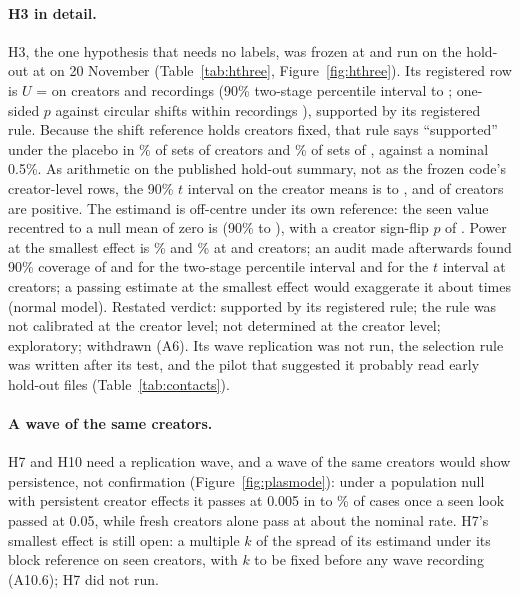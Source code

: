 \paragraph{H3 in detail.} H3, the one hypothesis that needs no labels, was frozen at \HThreeFrozenStamp{} and run on the
hold-out at \HThreeRunStamp{} on 20 November (Table~\ref{tab:hthree}, Figure~\ref{fig:hthree}). Its registered row is
$U$ = \HThreeU{} on \HThreeCreators{} creators and \HThreeRecordings{} recordings (90\% two-stage percentile interval
\HThreeRegLo{} to \HThreeRegHi; one-sided $p$ against circular shifts within recordings \HThreeShiftP), supported by its
registered rule. Because the shift reference holds creators fixed, that rule says ``supported'' under the placebo in
\HThreePlaceboTwelve\% of sets of \MinCreatorsRegistered{} creators and \HThreePlaceboSeventeen\% of sets of
\HThreeCreators, against a nominal 0.5\%. As arithmetic on the published hold-out summary, not as the frozen code's
creator-level rows, the 90\% $t$ interval on the \HThreeCreators{} creator means is \HThreeTLo{} to \HThreeTHi, and
\HThreePositive{} of \HThreeCreators{} creators are positive. The estimand is off-centre under its own reference: the
seen value recentred to a null mean of zero is \HThreeSeenRecentred{} (90\% \HThreeSeenRecentredLo{} to
\HThreeSeenRecentredHi), with a creator sign-flip $p$ of \HThreeSeenSignFlipP. Power at the smallest effect is
\HThreePowerTwelve\% and \HThreePowerSeventeen\% at \MinCreatorsRegistered{} and \HThreeCreators{} creators; an audit
made afterwards found 90\% coverage of \HThreeCovTwelve{} and \HThreeCovSeventeen{} for the two-stage percentile
interval and \HThreeCovT{} for the $t$ interval at \HThreeCreators{} creators; a passing estimate at the smallest effect
would exaggerate it about \HThreeTypeM{} times (normal model). Restated verdict: supported by its registered rule; the
rule was not calibrated at the creator level; not determined at the creator level; exploratory; withdrawn (A6). Its
wave replication was not run, the selection rule was written after its test, and the pilot that suggested it probably
read early hold-out files (Table~\ref{tab:contacts}).

\paragraph{A wave of the same creators.} H7 and H10 need a replication wave, and a wave of the same creators would show
persistence, not confirmation (Figure~\ref{fig:plasmode}): under a population null with persistent creator effects it
passes at 0.005 in \PlasmodeWaveLo{} to \PlasmodeWaveHi\% of cases once a seen look passed at 0.05, while fresh creators
alone pass at about the nominal rate. H7's smallest effect is still open: a multiple $k$ of the spread of its estimand
under its block reference on seen creators, with $k$ to be fixed before any wave recording (A10.6); H7 did not run.

